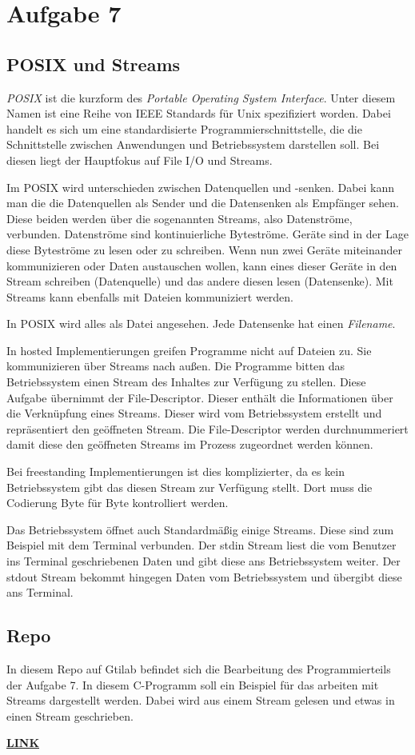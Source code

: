 \chapter{Aufgabe 7}
\section{POSIX und Streams}
\textit{POSIX} ist die kurzform des \textit{Portable Operating System Interface}.
Unter diesem Namen ist eine Reihe von IEEE Standards für Unix spezifiziert worden.
Dabei handelt es sich um eine standardisierte Programmierschnittstelle, die die Schnittstelle zwischen Anwendungen und Betriebssystem darstellen soll\cite{posix:2023}.
Bei diesen liegt der Hauptfokus auf File I/O und Streams.\par
Im POSIX wird unterschieden zwischen Datenquellen und -senken.
Dabei kann man die die Datenquellen als Sender und die Datensenken als Empfänger sehen.
Diese beiden werden über die sogenannten Streams, also Datenströme, verbunden.
Datenströme sind kontinuierliche Byteströme.
Geräte sind in der Lage diese Byteströme zu lesen oder zu schreiben.
Wenn nun zwei Geräte miteinander kommunizieren oder Daten austauschen wollen, kann eines dieser Geräte in den Stream schreiben (Datenquelle) und das andere diesen lesen (Datensenke).
Mit Streams kann ebenfalls mit Dateien kommuniziert werden.\par
In POSIX wird alles als Datei angesehen. 
Jede Datensenke hat einen \textit{Filename}.\par
In hosted Implementierungen greifen Programme nicht auf Dateien zu.
Sie kommunizieren über Streams nach außen.
Die Programme bitten das Betriebssystem einen Stream des Inhaltes zur Verfügung zu stellen.
Diese Aufgabe übernimmt der File-Descriptor.
Dieser enthält die Informationen über die Verknüpfung eines Streams.
Dieser wird vom Betriebssystem erstellt und repräsentiert den geöffneten Stream.
Die File-Descriptor werden durchnummeriert damit diese den geöffneten Streams im Prozess zugeordnet werden können\cite{filedescriptors:2011}.\par
Bei freestanding Implementierungen ist dies komplizierter, da es kein Betriebssystem gibt das diesen Stream zur Verfügung stellt.
Dort muss die Codierung Byte für Byte kontrolliert werden.\par 
Das Betriebssystem öffnet auch Standardmäßig einige Streams.
Diese sind zum Beispiel mit dem Terminal verbunden.
Der stdin Stream liest die vom Benutzer ins Terminal geschriebenen Daten und gibt diese ans Betriebssystem weiter.
Der stdout Stream bekommt hingegen Daten vom Betriebssystem und übergibt diese ans Terminal\cite{boekelmann:2023}.


\section{Repo} 
In diesem Repo auf Gtilab befindet sich die Bearbeitung des Programmierteils der Aufgabe 7.
In diesem C-Programm soll ein Beispiel für das arbeiten mit Streams dargestellt werden.
Dabei wird aus einem Stream gelesen und etwas in einen Stream geschrieben.\par
\href{https://gitlab.thga.de/daniel.krueger/pruefung_sose_2023_aufgabe_7_streams}{\textbf{LINK}}
